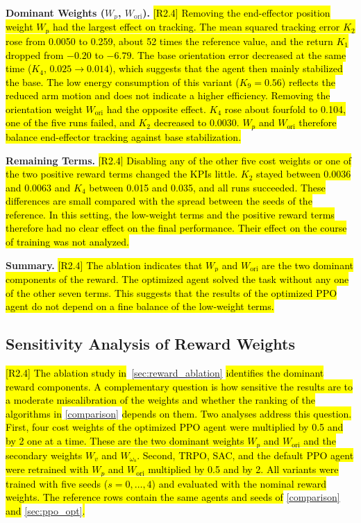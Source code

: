 \documentclass{ieeeaccess}
\newcommand{\hlone}[1]{{\sethlcolor{rone}\hl{#1}}}
\begin{document}
\textbf{Dominant Weights ($W_p$, $W_{\mathrm{ori}}$).} \hlone{[R2.4] Removing the end-effector position weight $W_p$ had
the largest effect on tracking. The mean squared tracking error $K_2$ rose from 0.0050 to 0.259, about 52
times the reference value, and the return $K_1$ dropped from $-0.20$ to $-6.79$. The base orientation error
decreased at the same time ($K_4$, $0.025 \to 0.014$), which suggests that the agent then mainly
stabilized the base. The low energy consumption of this variant ($K_9 = 0.56$) reflects the reduced arm
motion and does not indicate a higher efficiency. Removing the orientation weight $W_{\mathrm{ori}}$ had
the opposite effect. $K_4$ rose about fourfold to 0.104, one of the five runs failed, and $K_2$ decreased
to 0.0030. $W_p$ and $W_{\mathrm{ori}}$ therefore balance end-effector tracking against base
stabilization.}

\textbf{Remaining Terms.} \hlone{[R2.4] Disabling any of the other five cost weights or one of the two positive reward
terms changed the KPIs little. $K_2$ stayed between 0.0036 and 0.0063 and $K_4$ between 0.015 and 0.035,
and all runs succeeded. These differences are small compared with the spread between the seeds of the
reference. In this setting, the low-weight terms and the positive reward terms therefore had no clear
effect on the final performance. Their effect on the course of training was not analyzed.}

\textbf{Summary.} \hlone{[R2.4] The ablation indicates that $W_p$ and $W_{\mathrm{ori}}$ are the two dominant components of
the reward. The optimized agent solved the task without any one of the other seven terms. This suggests
that the results of the optimized PPO agent do not depend on a fine balance of the low-weight terms.}

\subsection{Sensitivity Analysis of Reward Weights}\label{sec:reward_sensitivity}
\hlone{[R2.4] The ablation study in}~\cref{sec:reward_ablation} \hlone{identifies the dominant reward components. A
complementary question is how sensitive the results are to a moderate miscalibration of the weights and
whether the ranking of the algorithms in} \cref{comparison} \hlone{depends on them. Two analyses address this
question. First, four cost weights of the optimized PPO agent were multiplied by 0.5 and by 2 one at a
time. These are the two dominant weights $W_p$ and $W_{\mathrm{ori}}$ and the secondary weights $W_v$ and
$W_{\omega_b}$. Second, TRPO, SAC, and the default PPO agent were retrained with $W_p$ and
$W_{\mathrm{ori}}$ multiplied by 0.5 and by 2. All variants were trained with five seeds
($s = 0,\dots,4$) and evaluated with the nominal reward weights. The reference rows contain the same
agents and seeds of} \cref{comparison} \hlone{and} \cref{sec:ppo_opt}\hlone{.}
\end{document}
